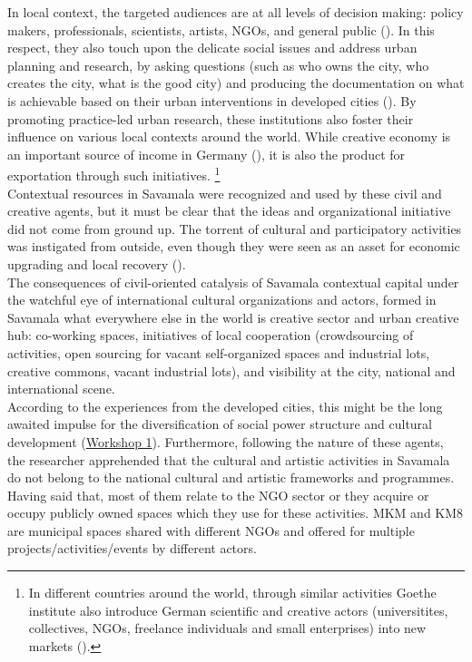 \documentclass[11pt]{report}
\begin{document}
In local context, the targeted audiences are at all levels of decision making: policy makers, professionals, scientists, artists, NGOs, and general public (\cite{British council}).
In this respect, they also touch upon the delicate social issues and address urban planning and research, by asking questions (such as who owns the city, who creates the city, what is the good city) and producing the documentation on what is achievable based on their urban interventions in developed cities (\cite{Urban places public spaces}).
By promoting practice-led urban research, these institutions also foster their influence on various local contexts around the world.
While creative economy is an important source of income in Germany (\cite{ref}), it is also the product for exportation through such initiatives. \footnote{In different countries around the world, through similar activities Goethe institute also introduce German scientific and creative actors (universitites, collectives, NGOs, freelance individuals and small enterprises) into new markets (\href{ref}{\citealt{waibel_creativity_2014}}).}
\\

Contextual resources in Savamala were recognized and used by these civil and creative agents, but it must be clear that the ideas and organizational initiative  did not come from ground up.
The torrent of cultural and participatory activities was instigated from outside, even though they were seen as an asset for economic upgrading and local recovery (\cite{British council}).
\\

The consequences of civil-oriented catalysis of Savamala contextual capital under the watchful eye of international cultural organizations and actors, formed in Savamala what everywhere else in the world is creative sector and urban creative hub: co-working spaces, initiatives of local cooperation (crowdsourcing of activities, open sourcing for vacant self-organized spaces and industrial lots, creative commons, vacant industrial lots), and visibility at the city, national and international scene.
\\

According to the experiences from the developed cities, this might be the long awaited impulse for the diversification of social power structure and cultural development
(\href{Expert Workshop}{Workshop 1}).
Furthermore, following the nature of these agents, the researcher apprehended that the cultural and artistic activities in Savamala do not belong to the national cultural and artistic frameworks and programmes.
Having said that, most of them relate to the NGO sector or they acquire or occupy publicly owned spaces which they use for these activities.
MKM and KM8 are municipal spaces shared with different NGOs and offered for multiple projects/activities/events by different actors.
\\
\end{document}
